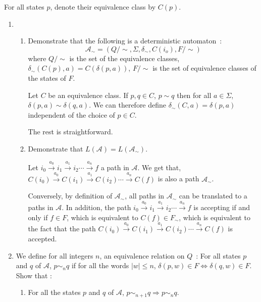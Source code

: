\documentclass[a4paper,11pt]{exam}
\newcommand{\A}{\mathcal{A}}
\begin{document}
\begin{questions}
  For all states $p$, denote their  equivalence class by $C(p)$.
  \begin{enumerate}
    \item 
      \begin{enumerate}
        \item Demonstrate that the following is a deterministic automaton~:
          \[
          \A_\sim = (Q/\sim, \Sigma,\delta_\sim, C(i_o), F/\sim )
          \]
          where $Q/\sim$ is the set of the equivalence classes,
          $\delta_\sim(C(p), a) = C(\delta(p,a))$,
          $F/\sim$ is the set of equivalence classes of the states of $F$.

          \begin{solution}
            Let $C$ be an equivalence class. If $p,q \in C$, $p \sim q$ then for all $a \in \Sigma$, $\delta(p,a) \sim \delta(q,a)$.
            We can therefore define $\delta_\sim(C,a)=\delta(p,a)$ independent of the choice of $p \in C$.
            
            The rest is straightforward.
          \end{solution}

        \item Demonstrate that $L(\A) = L(\A_\sim)$.\\

          \begin{solution}
            Let $i_0 \xrightarrow{a_0} i_1 \xrightarrow{a_1} i_2 \cdots \xrightarrow{a_n} f$ a path in $\A$.
            We get that, $C(i_0) \xrightarrow{a_0} C(i_1) \xrightarrow{a_1} C(i_2)
            \cdots \xrightarrow{a_n} C(f)$ is also a path $\A_\sim$.

            Conversely, by definition of $\A_\sim$, all paths in $\A_\sim$ can be translated to a paths in $\A$. In addition, the path $i_0 \xrightarrow{a_0} i_1 \xrightarrow{a_1} i_2 \cdots\xrightarrow{a_n} f$ is accepting if and only if $f \in F$, which is equivalent to $C(f) \in F_\sim$, which is equivalent to the fact that the path $C(i_0) \xrightarrow{a_0} C(i_1) \xrightarrow{a_1} C(i_2)
            \cdots \xrightarrow{a_n} C(f)$ is accepted.
          \end{solution}
      \end{enumerate}


    \item We define for all integers $ n $, an equivalence relation on $Q$~:
     For all states $p$ and $q$ of $\A$, $p \sim_n q$ if for all the words $|w|\leq n$, $\delta(p,w) \in F \Leftrightarrow
      \delta(q,w) \in F$.
      Show that :
      \begin{enumerate}
        \item For all the states $p$ and $q$ of $\A$, $ p\sim_{n+1} q \Rightarrow p \sim_{n} q $.


\end{enumerate}
\end{enumerate}
\end{questions}
\end{document}

